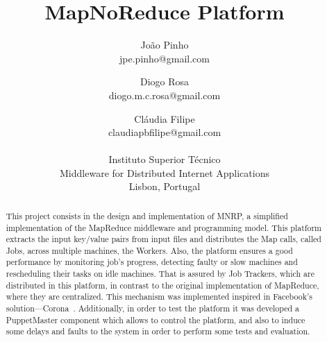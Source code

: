 \documentclass[times, 10pt,twocolumn]{article}
\begin{document}
	\title{MapNoReduce Platform}

	\author{
        João Pinho\\jpe.pinho@gmail.com\and Diogo Rosa\\
        diogo.m.c.rosa@gmail.com\and Cláudia Filipe\\
        claudiapbfilipe@gmail.com\\\\
		Instituto Superior Técnico\\
        Middleware for Distributed Internet Applications\\
        Lisbon, Portugal
    }
	\maketitle
	\thispagestyle{empty}


	\begin{abstract}
		This project consists in the design and implementation of \ac{MNRP}, a simplified implementation of the MapReduce middleware and programming model. This platform extracts the input key/value pairs from input files and distributes the Map calls, called Jobs, across multiple machines, the Workers.
		Also, the platform ensures a good performance by monitoring job's progress, detecting faulty or slow machines and rescheduling their tasks on idle machines. That is assured by Job Trackers, which are distributed in this platform, in contrast to the original implementation of MapReduce, where they are centralized. This mechanism was implemented inspired in Facebook's solution—Corona~\cite{Facebook2012}.
		Additionally, in order to test the platform it was developed a PuppetMaster component which allows to control the platform, and also to induce some delays and faults to the system in order to perform some tests and evaluation.
	\end{abstract}
\end{document}

